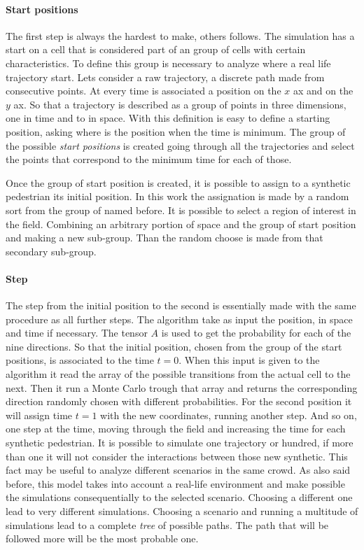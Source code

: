 \documentclass[class=article, crop=false]{standalone}
\begin{document}
\paragraph{Start positions}
The first step is always the hardest to make, others follows.
The simulation has a start on a cell that is considered part of an group of cells with certain characteristics.
To define this group is necessary to analyze where a real life trajectory start.
Lets consider a raw trajectory, a discrete path made from consecutive points.
At every time is associated a position on the $x$ ax and on the $y$ ax.
So that a trajectory is described as a group of points in three dimensions, one in time and to in space.
With this definition is easy to define a starting position, asking where is the position when the time is minimum.
The group of the possible \emph{start positions} is created going through all the trajectories and select the points that correspond to the minimum time for each of those.

Once the group of start position is created, it is possible to assign to a synthetic pedestrian its initial position.
In this work the assignation is made by a random sort from the group of named before.
It is possible to select a region of interest in the field.
Combining an arbitrary portion of space and the group of start position and making a new sub-group.
Than the random choose is made from that secondary sub-group.

\paragraph{Step}
The step from the initial position to the second is essentially made with the same procedure as all further steps.
The algorithm take as input the position, in space and time if necessary.
The tensor $A$ is used to get the probability for each of the nine directions.
So that the initial position, chosen from the group of the start positions, is associated to the time $t=0$.
When this input is given to the algorithm it read the array of the possible transitions from the actual cell to the next.
Then it run a Monte Carlo trough that array and returns the corresponding direction randomly chosen with different probabilities.
For the second position it will assign time $t=1$ with the new coordinates, running another step.
And so on, one step at the time, moving through the field and increasing the time for each synthetic pedestrian.
It is possible to simulate one trajectory or hundred, if more than one it will not consider the interactions between those new synthetic.
This fact may be useful to analyze different scenarios in the same crowd.
As also said before, this model takes into account a real-life environment and make possible the simulations consequentially to the selected scenario.
Choosing a different one lead to very different simulations.
Choosing a scenario and running a multitude of simulations lead to a complete \emph{tree} of possible paths.
The path that will be followed more will be the most probable one.
\end{document}

